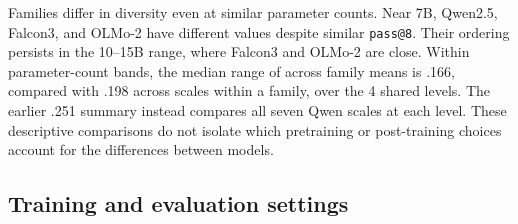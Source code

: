 Families differ in diversity even at similar parameter counts. Near 7B,
Qwen2.5, Falcon3, and OLMo-2 have different \pmd{} values despite similar
\texttt{pass@8}. Their ordering persists in the 10--15B range, where Falcon3
and OLMo-2 are close. Within parameter-count bands, the median range of
\pmd{} across family means is .166, compared with
.198 across scales within a family, over the
4 shared levels. The earlier .251 summary instead
compares all seven Qwen scales at each level. These descriptive comparisons
do not isolate which pretraining or post-training choices account for the
differences between models.

\clearpage
\subsection{Training and evaluation settings}
\label{app:repro-run-contract}
\label{app:comparison-design}


